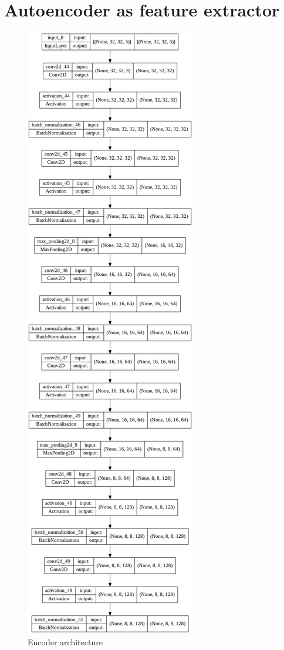   \section{Autoencoder as feature extractor}  
     \begin{figure}[h]
     	\centering
     	\includegraphics[width=0.35\linewidth]{images/encoder.png}
     	\caption{Encoder architecture }
     	\label{ne1}
     \end{figure}
     
   


